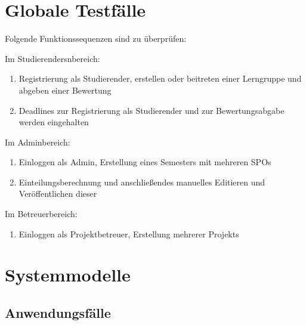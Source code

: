 \documentclass[parskip=full]{scrartcl}
\newcommand{\swtLabel}[1]{\textbf{/#1\arabic*0/}}
\begin{document}
\section{Globale Testfälle}
Folgende Funktionssequenzen sind zu überprüfen:

Im \glspl{Studierender}nbereich:


\begin{enumerate} [label=\swtLabel{T}]
  
  
  \item Registrierung als \gls{Studierender}, erstellen oder beitreten einer 
  \gls{Lerngruppe} und abgeben einer \gls{Bewertung}
  \item Deadlines zur Registrierung als \gls{Studierender} und zur
  \gls{Bewertung}sabgabe werden eingehalten

\end{enumerate}
Im \gls{Admin}bereich:
   \begin{enumerate} [label=\swtLabel{T}, resume]
  \item Einloggen als \gls{Admin}, Erstellung eines Semesters mit mehreren \glspl{SPO}
  \item \gls{Einteilung}sberechnung und anschließendes manuelles Editieren und
  Veröffentlichen dieser
\end{enumerate}
  Im Betreuerbereich:
   \begin{enumerate} [label=\swtLabel{T}, resume]
  \item Einloggen als \gls{Projektbetreuer}, Erstellung mehrerer \glspl{Projekt}
\end{enumerate}



\section{Systemmodelle}

\subsection{Anwendungsfälle}
\end{document}
